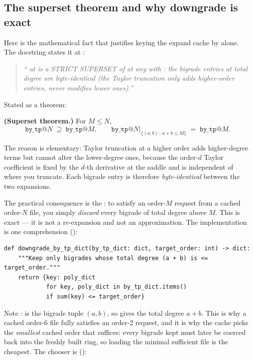 \subsection{The superset theorem and why downgrade is exact}

Here is the mathematical fact that justifies keying the expand cache by
 alone. The docstring states it at
:

\begin{quote}\itshape
`` at  is a STRICT SUPERSET of
 at any  with : the bigrade
entries at total degree  are byte-identical (the Taylor truncation
only adds higher-order entries, never modifies lower ones).''
\end{quote}

Stated as a theorem:

\begin{defn}
\textbf{(Superset theorem.)} For $M \le N$,
\[
  \texttt{by\_tp}@N \;\supseteq\; \texttt{by\_tp}@M,
  \qquad
  \texttt{by\_tp}@N\big|_{\{(a,b)\,:\,a+b\le M\}}
  \;=\; \texttt{by\_tp}@M .
\]
\end{defn}

The reason is elementary: Taylor truncation at a higher order adds
higher-degree terms but cannot alter the lower-degree ones, because the
order-$d$ Taylor coefficient is fixed by the $d$-th derivative at the saddle and
is independent of where you truncate. Each bigrade entry is therefore
\emph{byte-identical} between the two expansions.

The practical consequence is the : to satisfy an order-$M$
request from a cached order-$N$ file, you simply \emph{discard} every bigrade of
total degree above $M$. This is exact --- it is not a re-expansion and not an
approximation. The implementation is one comprehension
():

\begin{lstlisting}
def downgrade_by_tp_dict(by_tp_dict: dict, target_order: int) -> dict:
    """Keep only bigrades whose total degree (a + b) is <= target_order."""
    return {key: poly_dict
            for key, poly_dict in by_tp_dict.items()
            if sum(key) <= target_order}
\end{lstlisting}

Note :  is the bigrade tuple $(a,b)$, so 
gives the total degree $a+b$. This is why a cached order-6 file fully satisfies
an order-2 request, and it is why the cache picks the \emph{smallest} cached
order that suffices: every bigrade kept must later be coerced back into the
freshly built ring, so loading the minimal sufficient file is the cheapest. The
chooser is 
():

